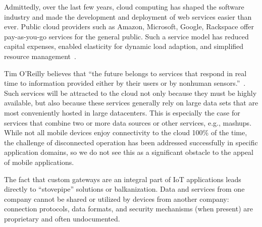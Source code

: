 Admittedly, over the last few years, cloud computing has shaped the software
industry and made the development and deployment of web services easier than
ever. Public cloud providers such as Amazon, Microsoft, Google, Rackspace offer
pay-as-you-go services for the general public.  Such a service model has reduced
capital expenses, enabled elasticity for dynamic load adaption, and simplified
resource management~\cite{armbrust2010view}.

Tim O’Reilly believes that ``the future belongs to services that respond in real
time to information provided either by their users or by nonhuman
sensors.''~\cite{siegele2008let}. Such services will be attracted to the cloud
not only because they must be highly available, but also because these services
generally rely on large data sets that are most conveniently hosted in large
datacenters. This is especially the case for services that combine two or more
data sources or other services, e.g., mashups. While not all mobile devices
enjoy connectivity to the cloud 100\% of the time, the challenge of disconnected
operation has been addressed successfully in specific application domains, so we
do not see this as a significant obstacle to the appeal of mobile applications.

The fact that custom gateways are an integral part of IoT applications leads
directly to ``stovepipe'' solutions or balkanization. Data and services from one
company cannot be shared or utilized by devices from another company: connection
protocols, data formats, and security mechanisms (when present) are proprietary
and often undocumented.

